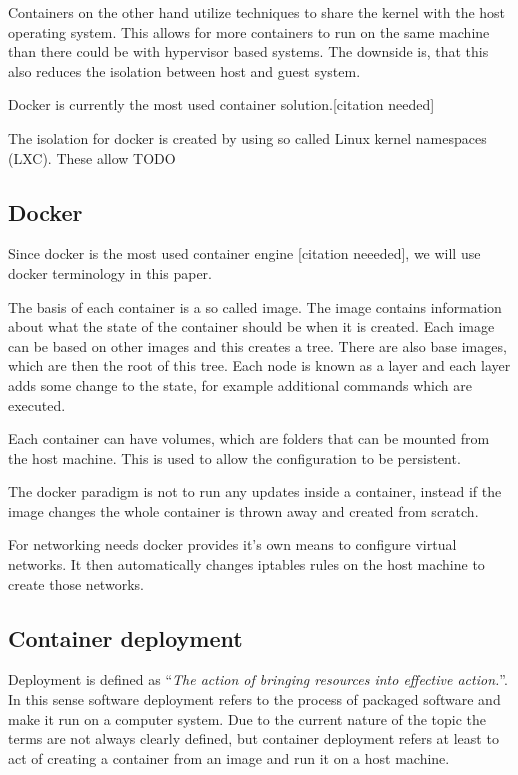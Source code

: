 \documentclass[conference]{IEEEtran}
\begin{document}
Containers on the other hand utilize techniques to share the kernel with the host operating system. This allows for more containers to run on the same machine than there could be with hypervisor based systems. The downside is, that this also reduces the isolation between host and guest system.

Docker is currently the most used container solution.[citation needed]

The isolation for docker is created by using so called Linux kernel namespaces (LXC). These allow TODO

\subsection{Docker}

Since docker is the most used container engine [citation neeeded], we will use docker terminology in this paper.

The basis of each container is a so called image. The image contains information about what the state of the container should be when it is created. Each image can be based on other images and this creates a tree. There are also base images, which are then the root of this tree. Each node is known as a layer and each layer adds some change to the state, for example additional commands which are executed.

Each container can have volumes, which are folders that can be mounted from the host machine. This is used to allow the configuration to be persistent.

The docker paradigm is not to run any updates inside a container, instead if the image changes the whole container is thrown away and created from scratch.

For networking needs docker provides it's own means to configure virtual networks. It then automatically changes iptables rules on the host machine to create those networks.

\subsection{Container deployment}

Deployment is defined as ``\textit{The action of bringing resources into effective action.}''\cite{deploymentdict}. In this sense software deployment refers to the process of packaged software and make it run on a computer system.
Due to the current nature of the topic the terms are not always clearly defined, but container deployment refers at least to act of creating a container from an image and run it on a host machine.
\end{document}

